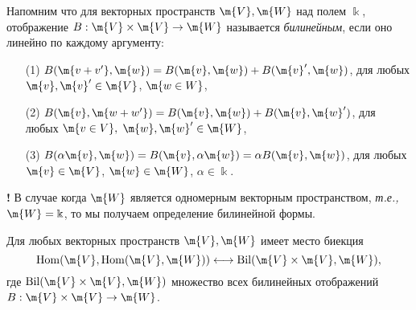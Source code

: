 Напомним что для векторных пространств $\m{V},\m{W}$ над полем $\Bbbk$, отображение $B:\m{V}\times \m{V} \to \m{W}$ называется \textit{билинейным}, если оно линейно по каждому аргументу:
\begin{itemize}
    \item[(1)] $B(\m{v+v'},\m{w}) = B(\m{v},\m{w}) + B(\m{v}',\m{w})$, для любых $\m{v}, \m{v}' \in \m{V}$, $\m{w \in W}$,
    \item[(2)] $B(\m{v},\m{w+w'}) = B(\m{v},\m{w}) + B(\m{v},\m{w}')$, для любых $\m{v\in V},$ $\m{w}, \m{w}' \in \m{W}$,
    \item[(3)] $B(\alpha \m{v}, \m{w}) = B(\m{v}, \alpha \m{w}) = \alpha B(\m{v},\m{w})$, для любых $\m{v} \in \m{V}$, $\m{w} \in \m{W}$, $\alpha \in \Bbbk.$
\end{itemize}

\begin{mydanger}{\bf !}
    В случае когда $\m{W}$ является одномерным векторным пространством, \textit{т.е.,} $\m{W} = \Bbbk$, то мы получаем определение билинейной формы.
\end{mydanger}


\begin{proposition}\label{bil=hom}
    Для любых векторных пространств $\m{V},\m{W}$ имеет место биекция
    \[
       \mathrm{Hom}(\m{V}, \mathrm{Hom}(\m{V}, \m{W})) \longleftrightarrow   \mathrm{Bil}(\m{V}\times \m{V}, \m{W}),
    \]
    где $\mathrm{Bil}(\m{V}\times \m{V}, \m{W})$ множество всех билинейных отображений $B:\m{V}\times \m{V} \to \m{W}$.
\end{proposition}

